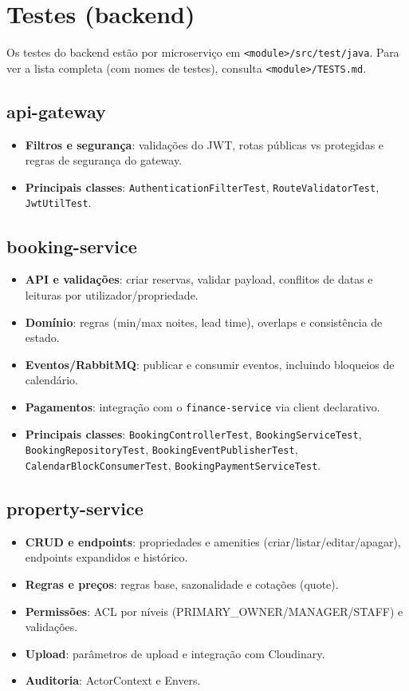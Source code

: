 \documentclass[11pt,a4paper]{article}
\begin{document}
\section{Testes (backend)}
Os testes do backend estão por microserviço em \texttt{<module>/src/test/java}. Para ver a lista completa (com nomes de testes), consulta \texttt{<module>/TESTS.md}.

\subsection{api-gateway}
\begin{itemize}[nosep]
  \item \textbf{Filtros e segurança}: validações do JWT, rotas públicas vs protegidas e regras de segurança do gateway.
  \item \textbf{Principais classes}: \texttt{AuthenticationFilterTest}, \texttt{RouteValidatorTest}, \texttt{JwtUtilTest}.
\end{itemize}

\subsection{booking-service}
\begin{itemize}[nosep]
  \item \textbf{API e validações}: criar reservas, validar payload, conflitos de datas e leituras por utilizador/propriedade.
  \item \textbf{Domínio}: regras (min/max noites, lead time), overlaps e consistência de estado.
  \item \textbf{Eventos/RabbitMQ}: publicar e consumir eventos, incluindo bloqueios de calendário.
  \item \textbf{Pagamentos}: integração com o \texttt{finance-service} via client declarativo.
  \item \textbf{Principais classes}: \texttt{BookingControllerTest}, \texttt{BookingServiceTest}, \texttt{BookingRepositoryTest}, \texttt{BookingEventPublisherTest}, \texttt{CalendarBlockConsumerTest}, \texttt{BookingPaymentServiceTest}.
\end{itemize}

\subsection{property-service}
\begin{itemize}[nosep]
  \item \textbf{CRUD e endpoints}: propriedades e amenities (criar/listar/editar/apagar), endpoints expandidos e histórico.
  \item \textbf{Regras e preços}: regras base, sazonalidade e cotações (quote).
  \item \textbf{Permissões}: ACL por níveis (PRIMARY\_OWNER/MANAGER/STAFF) e validações.
  \item \textbf{Upload}: parâmetros de upload e integração com Cloudinary.
  \item \textbf{Auditoria}: ActorContext e Envers.
\end{itemize}
\end{document}
